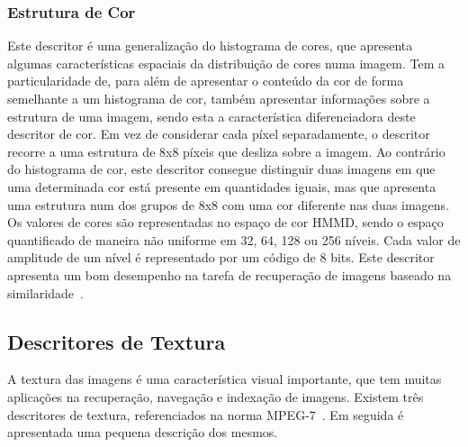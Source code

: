 \subsubsection{Estrutura de Cor}

Este descritor é uma generalização do histograma de cores, que apresenta algumas características espaciais da distribuição de cores numa imagem. Tem a particularidade de, para além de apresentar o conteúdo da cor de forma semelhante a um histograma de cor, também apresentar informações sobre a estrutura de uma imagem, sendo esta a característica diferenciadora deste descritor de cor. Em vez de considerar cada píxel separadamente, o descritor recorre a uma estrutura de 8x8 píxeis que desliza sobre a imagem. Ao contrário do histograma de cor, este descritor consegue distinguir duas imagens em que uma determinada cor está presente em quantidades iguais, mas que apresenta uma estrutura num dos grupos de  8x8 com uma cor diferente nas duas imagens. Os valores de cores são representadas no espaço de cor HMMD, sendo o espaço quantificado de maneira não uniforme em 32, 64, 128 ou 256 níveis. 
Cada valor de amplitude de um nível é representado por um código de 8 bits. Este descritor apresenta um bom desempenho na tarefa de recuperação de imagens baseado na similaridade~\cite{Modi2008}.

%

\subsection{Descritores de Textura}

A textura das imagens é uma característica visual importante, que tem muitas aplicações na recuperação, navegação e indexação de imagens. Existem três descritores de textura, referenciados na norma MPEG-7~\cite{Wu2001}. Em seguida é apresentada uma pequena descrição dos mesmos.

